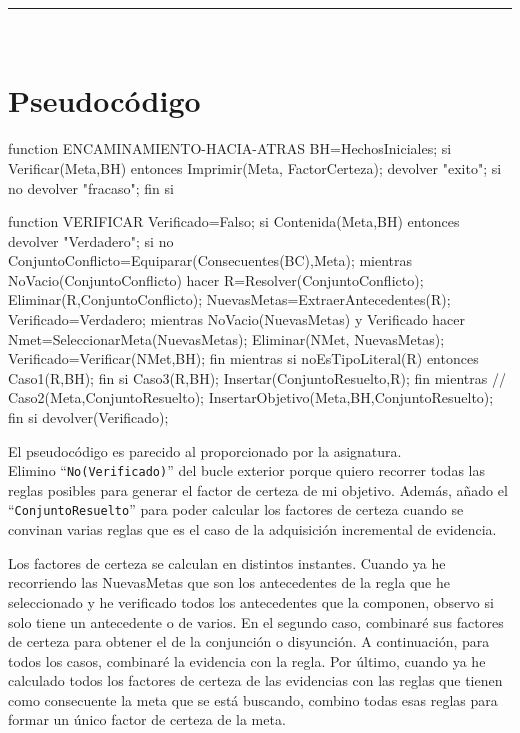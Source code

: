 
\begin{center}
	{\fboxrule=4pt } \\
	\setcounter{chapter}{2}
	\setcounter{section}{0}
	\rule{15cm}{0pt} \\
\end{center}

\section{Pseudocódigo}
\begin{listing}[language=Pascal]
function ENCAMINAMIENTO-HACIA-ATRAS
  BH=HechosIniciales;
  si Verificar(Meta,BH) entonces 
	Imprimir(Meta, FactorCerteza);
 	devolver "exito";
  si no
    devolver "fracaso";
  fin si
\end{listing}
\begin{listing}[language=Pascal]
function VERIFICAR
  Verificado=Falso;
  si Contenida(Meta,BH) entonces devolver "Verdadero";
  si no
    ConjuntoConflicto=Equiparar(Consecuentes(BC),Meta);
    mientras NoVacio(ConjuntoConflicto) hacer
      R=Resolver(ConjuntoConflicto);
	  Eliminar(R,ConjuntoConflicto);
	  NuevasMetas=ExtraerAntecedentes(R);
	  Verificado=Verdadero;
	  mientras NoVacio(NuevasMetas) y Verificado hacer
	  	Nmet=SeleccionarMeta(NuevasMetas);
		Eliminar(NMet, NuevasMetas);
		Verificado=Verificar(NMet,BH);
	  fin mientras
	  si noEsTipoLiteral(R) entonces Caso1(R,BH);
	  fin si
	  Caso3(R,BH);
	  Insertar(ConjuntoResuelto,R); 
	fin mientras
	// Caso2(Meta,ConjuntoResuelto);
	InsertarObjetivo(Meta,BH,ConjuntoResuelto); 
  fin si
  devolver(Verificado);
\end{listing}

\par El pseudocódigo es parecido al proporcionado por la asignatura. \\
Elimino ``\texttt{No(Verificado)}'' del bucle exterior porque quiero recorrer todas
las reglas posibles para generar el factor de certeza de mi objetivo. Además,
añado el ``\texttt{ConjuntoResuelto}'' para poder calcular los factores de certeza 
cuando se convinan varias reglas que es el caso de la adquisición incremental de evidencia.
\par Los factores de certeza se calculan en distintos instantes. 
Cuando ya he recorriendo las NuevasMetas que son los antecedentes de la regla que he seleccionado 
y he verificado todos los antecedentes que la componen, observo si solo tiene un antecedente o
de varios. En el segundo caso, combinaré sus factores de certeza para obtener el de la conjunción o disyunción. 
A continuación, para todos los casos, combinaré la evidencia con la regla.
Por último, cuando ya he calculado todos los factores de certeza de las evidencias con las reglas que tienen como consecuente la meta
que se está buscando, combino todas esas reglas para formar un único factor de certeza de la meta.





